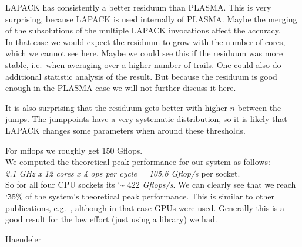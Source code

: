 \documentclass[a4paper,final,ngerman,english]{article}
\begin{document}
LAPACK has consistently a better residuum than PLASMA.\@
This is very surprising, because LAPACK is used internally of PLASMA.\@
Maybe the merging of the subsolutions of the multiple LAPACK invocations affect the accuracy.\\
In that case we would expect the residuum to grow with the number of cores, which we cannot see here.
Maybe we could see this if the residuum was more stable, i.e.\ when averaging over a higher number of trails.
One could also do additional statistic analysis of the result.
But because the residuum is good enough in the PLASMA case we will not further discuss it here.

It is also surprising that the residuum gets better with higher $n$ between the jumps.
The jumppoints have a very systematic distribution, so it is likely that
LAPACK changes some parameters when around these thresholds.

For mflops we roughly get 150 Gflops.\\
We computed the theoretical peak performance for our system as follows:\\
\textit{2.1 GHz x 12 cores x 4 ops per cycle = 105.6 Gflop/s} per socket.~\cite{lawn266} \\
So for all four CPU sockets its \char`\~ $422$ \textit{Gflops/s}.
We can clearly see that we reach \char`\~ 35\% of the system's theoretical peak performance.
This is similar to other publications, e.g.~\cite{lawn266},
although in that case GPUs were used.
Generally this is a good result for the low effort (just using a library) we had.
\begin{flushright} Haendeler \end{flushright} 
%
\ \\
\ \\
\ \\
\ \\
\begin{footnotesize}
\end{footnotesize}
\end{document}
